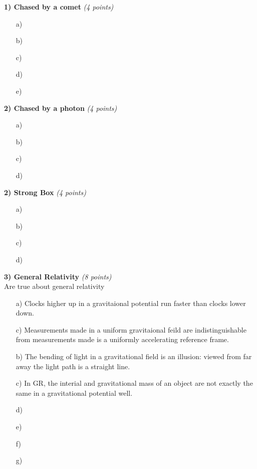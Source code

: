 {\large


\textbf{1) Chased by a comet }\hfill \textit{(4 points)}\\


\begin{itemize}
\item[a)] 
\item[b)] 
\item[c)] 
\item[d)] 
\item[e)] 
\end{itemize}

\vspace{0.1in}

\textbf{2) Chased by a photon }\hfill \textit{(4 points)}\\

\begin{itemize}
\item[a)] 
\item[b)] 
\item[c)] 
\item[d)] 
\end{itemize}

\vspace{0.1in}

\textbf{2) Strong Box }\hfill \textit{(4 points)}\\

\begin{itemize}
\item[a)] 
\item[b)] 
\item[c)] 
\item[d)] 
\end{itemize}

\vspace{0.1in}


\textbf{3) General Relativity }\hfill \textit{(8 points)}\\
Are true about general relativity
\begin{itemize}
\item[a)] Clocks higher up in a gravitaional potential run faster than clocks lower down.
\item[c)] Measurements made in a uniform gravitaional feild are indistinguishable from measurements made is a uniformly accelerating reference frame.
\item[b)] The bending of light in a gravitational field is an illusion: viewed from far away the light path is a straight line.
\item[c)] In GR, the interial and gravitational mass of an object are not exactly the same in a gravitational potential well.
\item[d)] 
\item[e)] 
\item[f)] 
\item[g)] 
\end{itemize}

}
